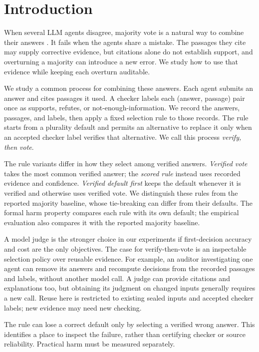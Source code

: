 \section{Introduction}
\label{sec:intro}

When several LLM agents disagree, majority vote is a natural way to combine their answers \citep{wang2023selfconsistency}. It fails when the agents share a mistake. The passages they cite may supply corrective evidence, but citations alone do not establish support, and overturning a majority can introduce a new error. We study how to use that evidence while keeping each overturn auditable.

We study a common process for combining these answers. Each agent submits an answer and cites passages it used. A checker labels each (answer, passage) pair once as supports, refutes, or not-enough-information. We record the answers, passages, and labels, then apply a fixed selection rule to those records. The rule starts from a plurality default and permits an alternative to replace it only when an accepted checker label verifies that alternative. We call this process \emph{verify, then vote}.

The rule variants differ in how they select among verified answers. \emph{Verified vote} takes the most common verified answer; the \emph{scored rule} instead uses recorded evidence and confidence. \emph{Verified default first} keeps the default whenever it is verified and otherwise uses verified vote. We distinguish these rules from the reported majority baseline, whose tie-breaking can differ from their defaults. The formal harm property compares each rule with its own default; the empirical evaluation also compares it with the reported majority baseline.

A model judge is the stronger choice in our experiments if first-decision accuracy and cost are the only objectives. The case for verify-then-vote is an inspectable selection policy over reusable evidence. For example, an auditor investigating one agent can remove its answers and recompute decisions from the recorded passages and labels, without another model call. A judge can provide citations and explanations too, but obtaining its judgment on changed inputs generally requires a new call. Reuse here is restricted to existing sealed inputs and accepted checker labels; new evidence may need new checking.

The rule can lose a correct default only by selecting a verified wrong answer. This identifies a place to inspect the failure, rather than certifying checker or source reliability. Practical harm must be measured separately.

